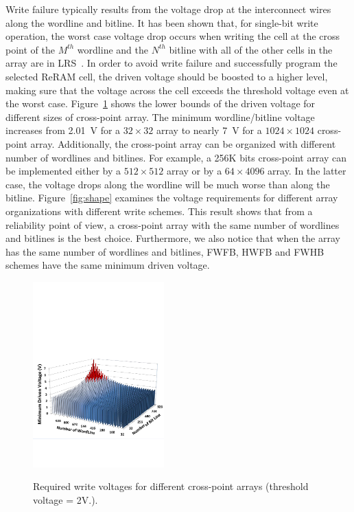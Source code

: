 Write failure typically results from the voltage drop at the interconnect
wires along the wordline and bitline. It has been shown
that, for single-bit write operation, the worst
case voltage drop occurs when writing the cell at the cross point of the
$M^{th}$ wordline and the $N^{th}$ bitline with all of the other cells in
the array are in LRS~\cite{crossbar_TED_2010}. In order to avoid write failure and successfully program the selected ReRAM cell, the driven voltage should be boosted to a higher level, making sure that the voltage across the cell exceeds the threshold voltage even at the worst case. Figure~\ref{fig:worst_v} shows the lower bounds of the driven voltage for different sizes of cross-point array. The minimum wordline/bitline voltage increases from 2.01~V for a
$32 \times 32$ array to nearly 7~V for a $1024 \times 1024$ cross-point
array. Additionally, the cross-point array can be
organized with different number of wordlines and bitlines. For example, a
256K bits cross-point array can be implemented either by a $512 \times
512$ array or by a $64 \times 4096$ array. In the latter case, the voltage drops along the wordline will be much worse than along the bitline.
Figure~\ref{fig:shape} examines the voltage requirements for different
array organizations with different write schemes. This result shows that
from a reliability point of view, a cross-point array with the same number of wordlines and bitlines is the best choice. Furthermore, we also notice
that when the array has the same number of wordlines and bitlines, FWFB,
HWFB and FWHB schemes have the same minimum driven voltage.


\begin{figure}%
\centering
\hspace{-5pt}
  \includegraphics[width=0.45\textwidth]{./figures/worst_v_f.pdf}\\
  \caption{Required write voltages for different cross-point arrays (threshold voltage = 2V.). }\label{fig:worst_v}
  \vspace{-5pt}
\end{figure}


